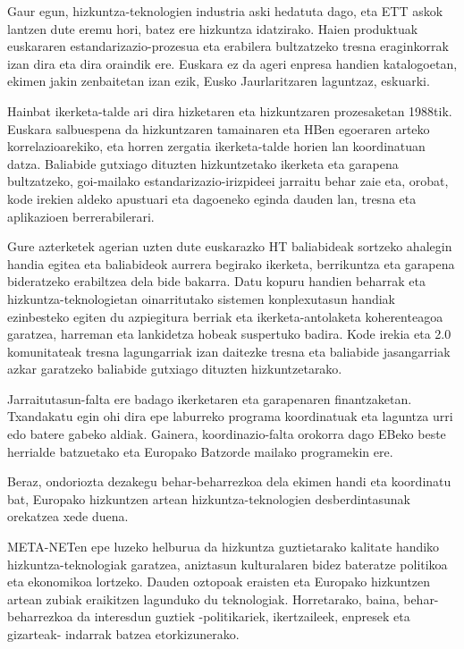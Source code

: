 \begin{multicols}{2}
    Gaur egun, hizkuntza-teknologien industria aski hedatuta dago, eta ETT askok lantzen dute eremu hori, batez ere hizkuntza idatzirako. Haien produktuak euskararen estandarizazio-prozesua eta erabilera bultzatzeko tresna eraginkorrak izan dira eta dira oraindik ere. Euskara ez da ageri enpresa handien katalogoetan, ekimen jakin zenbaitetan izan ezik, Eusko Jaurlaritzaren laguntzaz, eskuarki.

    Hainbat ikerketa-talde ari dira hizketaren eta hizkuntzaren prozesaketan 1988tik. Euskara salbuespena da hizkuntzaren tamainaren eta HBen egoeraren arteko korrelazioarekiko, eta horren zergatia ikerketa-talde horien lan koordinatuan datza. Baliabide gutxiago dituzten hizkuntzetako ikerketa eta garapena bultzatzeko, goi-mailako estandarizazio-irizpideei jarraitu behar zaie eta, orobat, kode irekien aldeko apustuari eta dagoeneko eginda dauden lan, tresna eta aplikazioen berrerabilerari.

    Gure azterketek agerian uzten dute euskarazko HT baliabideak sortzeko ahalegin handia egitea eta baliabideok aurrera begirako ikerketa, berrikuntza eta garapena bideratzeko erabiltzea dela bide bakarra. Datu kopuru handien beharrak eta hizkuntza-teknologietan oinarritutako sistemen konplexutasun handiak ezinbesteko egiten du azpiegitura berriak eta ikerketa-antolaketa koherenteagoa garatzea, harreman eta lankidetza hobeak suspertuko badira. Kode irekia eta 2.0 komunitateak tresna lagungarriak izan daitezke tresna eta baliabide jasangarriak azkar garatzeko baliabide gutxiago dituzten hizkuntzetarako.

    Jarraitutasun-falta ere badago ikerketaren eta garapenaren finantzaketan. Txandakatu egin ohi dira epe laburreko programa koordinatuak eta laguntza urri edo batere gabeko aldiak. Gainera, koordinazio-falta orokorra dago EBeko beste herrialde batzuetako eta Europako Batzorde mailako programekin ere.

    Beraz, ondoriozta dezakegu behar-beharrezkoa dela ekimen handi eta koordinatu bat, Europako hizkuntzen artean hizkuntza-teknologien desberdintasunak orekatzea xede duena.

    META-NETen epe luzeko helburua da hizkuntza guztietarako kalitate handiko hizkuntza-teknologiak garatzea, aniztasun kulturalaren bidez bateratze politikoa eta ekonomikoa lortzeko. Dauden oztopoak eraisten eta Europako hizkuntzen artean zubiak eraikitzen lagunduko du teknologiak. Horretarako, baina, behar-beharrezkoa da interesdun guztiek -politikariek, ikertzaileek, enpresek eta gizarteak- indarrak batzea etorkizunerako.


\end{multicols}

